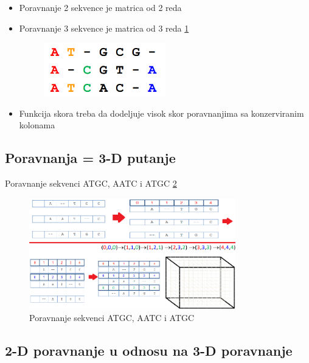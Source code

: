 \begin{itemize}
    \item Poravnanje 2 sekvence je matrica od 2 reda
    \item Poravnanje 3 sekvence je matrica od 3 reda \ref{slika:poravnavanjeMatrica}
    \begin{figure}[]
    \centering
    \includegraphics[width=0.5\textwidth]{poglavlja/5/slike/poravnanjeMatrica.png}
    \label{slika:poravnavanjeMatrica}
    \end{figure}
    \item Funkcija skora treba da dodeljuje visok skor poravnanjima sa konzerviranim kolonama
\end{itemize}

\subsection{Poravnanja = 3-D putanje}

Poravnanje sekvenci ATGC, AATC i ATGC \ref{slika:3d}

\begin{figure}[]
\centering
\includegraphics[width=0.8\textwidth]{poglavlja/5/slike/3dPoravnanja.png}
\caption{Poravnanje sekvenci ATGC, AATC i ATGC}
\label{slika:3d}
\end{figure}

\subsection{2-D poravnanje u odnosu na 3-D poravnanje}

